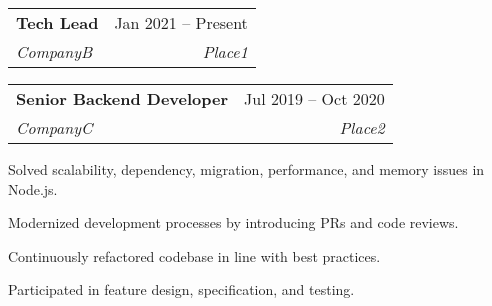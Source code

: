 \documentclass[a4paper,11pt]{article}
\makeatletter
\newcommand{\placeblock}[4]{%
    \vspace{-2pt}\item%
    \begin{tabular*}{0.97\textwidth}[t]{l@{\extracolsep{\fill}}r}%
        \textbf{#1} & #2 \\%
        \textit{\small#3} & \textit{\small #4} \\%
    \end{tabular*}\vspace{-7pt}%
}%
\newenvironment*{place}[4]{%
    \placeblock{#1}{#2}{#3}{#4}
    \begin{itemList}
}{%
    \end{itemList}
}%
\newcommand{\reflectiz}{Reflectiz}
\newcommand{\appdome}{Appdome}
\newcommand{\ramatgan}{Ramat Gan, Israel}
\newcommand{\telaviv}{Tel Aviv}
\renewcommand{\reflectiz}{CompanyB}
\renewcommand{\appdome}{CompanyC}
\renewcommand{\ramatgan}{Place1}
\renewcommand{\telaviv}{Place2}
\newenvironment{jobReflectizLead}{%
    \begin{place}{Tech Lead}{Jan 2021 -- Present}{\reflectiz}{\ramatgan}
}{%
    \end{place}
}
\newenvironment{jobAppdome}{%
    \begin{place}{Senior Backend Developer}{Jul 2019 -- Oct 2020}{\appdome}{\telaviv}
}{
    \end{place}
}
\makeatother
\begin{document}
\begin{sectionList}
\begin{jobReflectizLead}
     \end{jobReflectizLead}

    \begin{jobAppdome}
        \item Solved scalability, dependency, migration, performance, and memory issues in Node.js.
        \item Modernized development processes by introducing PRs and code reviews.
        \item Continuously refactored codebase in line with best practices.
        \item Participated in feature design, specification, and testing.
    \end{jobAppdome}


\end{sectionList}
\end{document}
